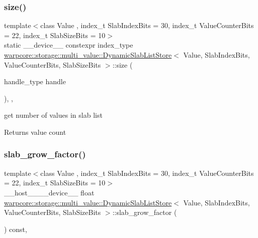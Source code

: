 \subsubsection{\texorpdfstring{size()}{size()}}
{\footnotesize\ttfamily template$<$class Value , index\+\_\+t Slab\+Index\+Bits = 30, index\+\_\+t Value\+Counter\+Bits = 22, index\+\_\+t Slab\+Size\+Bits = 10$>$ \\
static \+\_\+\+\_\+device\+\_\+\+\_\+ constexpr index\+\_\+type \hyperlink{classwarpcore_1_1storage_1_1multi__value_1_1DynamicSlabListStore}{warpcore\+::storage\+::multi\+\_\+value\+::\+Dynamic\+Slab\+List\+Store}$<$ Value, Slab\+Index\+Bits, Value\+Counter\+Bits, Slab\+Size\+Bits $>$\+::size (\begin{DoxyParamCaption}\item[{handle\+\_\+type}]{handle }\end{DoxyParamCaption})\hspace{0.3cm}{\ttfamily [inline]}, {\ttfamily [static]}, {\ttfamily [noexcept]}}



get number of values in slab list 

\begin{DoxyReturn}{Returns}
value count 
\end{DoxyReturn}
\mbox{\label{classwarpcore_1_1storage_1_1multi__value_1_1DynamicSlabListStore_a79fb2a41f22cf59f4edf49c3de82d9dd}} 
\subsubsection{\texorpdfstring{slab\+\_\+grow\+\_\+factor()}{slab\_grow\_factor()}}
{\footnotesize\ttfamily template$<$class Value , index\+\_\+t Slab\+Index\+Bits = 30, index\+\_\+t Value\+Counter\+Bits = 22, index\+\_\+t Slab\+Size\+Bits = 10$>$ \\
\+\_\+\+\_\+host\+\_\+\+\_\+\+\_\+\+\_\+device\+\_\+\+\_\+ float \hyperlink{classwarpcore_1_1storage_1_1multi__value_1_1DynamicSlabListStore}{warpcore\+::storage\+::multi\+\_\+value\+::\+Dynamic\+Slab\+List\+Store}$<$ Value, Slab\+Index\+Bits, Value\+Counter\+Bits, Slab\+Size\+Bits $>$\+::slab\+\_\+grow\+\_\+factor (\begin{DoxyParamCaption}{ }\end{DoxyParamCaption}) const\hspace{0.3cm}{\ttfamily [inline]}, {\ttfamily [noexcept]}}



